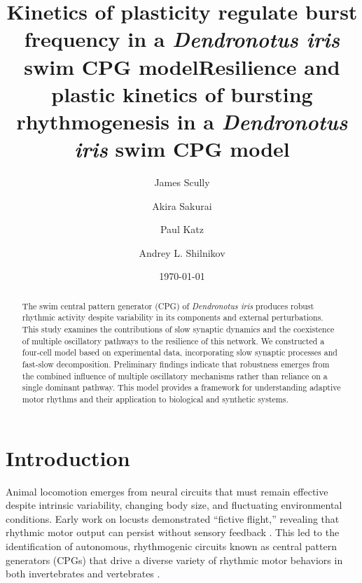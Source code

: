 \documentclass[nofootinbib,aip,amsmath,amssymb,reprint,twocolumn,10pt]{revtex4-2}
\begin{document}
\title{Kinetics of plasticity regulate burst frequency in a {\em Dendronotus iris} swim CPG model}
\title{Resilience and plastic kinetics of bursting rhythmogenesis in a {\em Dendronotus iris} swim CPG model}


\author{James Scully}
\author{Akira Sakurai}
\author{Paul Katz}
\author{Andrey L. Shilnikov}


\date{\today}
\begin{abstract}

The swim central pattern generator (CPG) of {\em Dendronotus iris} produces robust rhythmic activity despite variability in its components and external perturbations.
This study examines the contributions of slow synaptic dynamics and the coexistence of multiple oscillatory pathways to the resilience of this network.
We constructed a four-cell model based on experimental data, incorporating slow synaptic processes and fast-slow decomposition.
Preliminary findings indicate that robustness emerges from the combined influence of multiple oscillatory mechanisms rather than reliance on a single dominant pathway.
This model provides a framework for understanding adaptive motor rhythms and their application to biological and synthetic systems.
\end{abstract}

\maketitle
\section{Introduction}
Animal locomotion emerges from neural circuits that must remain effective despite intrinsic variability, changing body size, and fluctuating environmental conditions.
Early work on locusts demonstrated ``fictive flight,'' revealing that rhythmic motor output can persist without sensory feedback \cite{Wilson1961}.
This led to the identification of autonomous, rhythmogenic circuits known as central pattern generators (CPGs) that drive a diverse variety of rhythmic motor behaviors in both invertebrates and vertebrates \cite{MarderCalabrese1996, Kiehn2006}.
\end{document}
